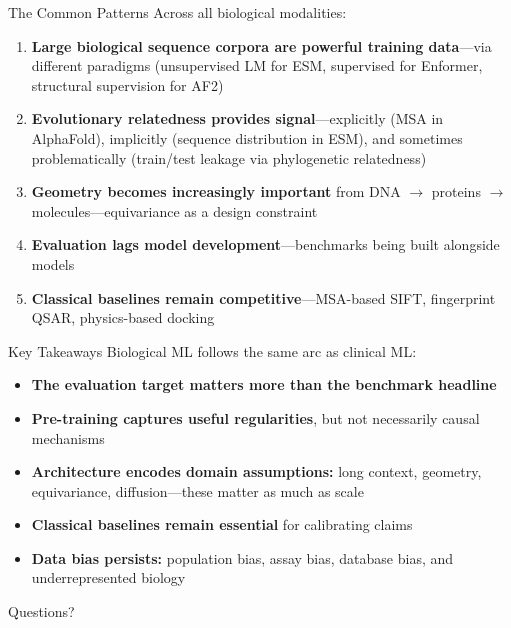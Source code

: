 \documentclass[aspectratio=169,10pt]{beamer}
\begin{document}
\begin{frame}{The Common Patterns}
Across all biological modalities:
\begin{enumerate}[<+->]
    \item \textbf{Large biological sequence corpora are powerful training data}---via different paradigms (unsupervised LM for ESM, supervised for Enformer, structural supervision for AF2)
    \item \textbf{Evolutionary relatedness provides signal}---explicitly (MSA in AlphaFold), implicitly (sequence distribution in ESM), and sometimes problematically (train/test leakage via phylogenetic relatedness)
    \item \textbf{Geometry becomes increasingly important} from DNA $\to$ proteins $\to$ molecules---equivariance as a design constraint
    \item \textbf{Evaluation lags model development}---benchmarks being built alongside models
    \item \textbf{Classical baselines remain competitive}---MSA-based SIFT, fingerprint QSAR, physics-based docking
\end{enumerate}
\end{frame}

\begin{frame}{Key Takeaways}
Biological ML follows the same arc as clinical ML:
\begin{itemize}[<+->]
    \item \textbf{The evaluation target matters more than the benchmark headline}
    \item \textbf{Pre-training captures useful regularities}, but not necessarily causal mechanisms
    \item \textbf{Architecture encodes domain assumptions:} long context, geometry, equivariance, diffusion---these matter as much as scale
    \item \textbf{Classical baselines remain essential} for calibrating claims
    \item \textbf{Data bias persists:} population bias, assay bias, database bias, and underrepresented biology
\end{itemize}
\end{frame}

\begin{frame}[standout]
    Questions?
\end{frame}

\appendix
\end{document}
